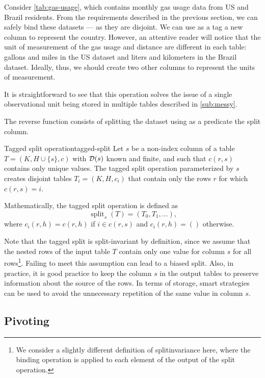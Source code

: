 Consider \cref{tab:gas-usage}, which contains monthly gas usage data from
US and Brazil residents.  From the requirements described in the previous section, we can
safely bind these datasets --- as they are disjoint.  We can use as a tag a new column to
represent the country.  However, an attentive reader will notice that the unit of
measurement of the gas usage and distance are different in each table: gallons and miles
in the US dataset and liters and kilometers in the Brazil dataset.  Ideally, thus, we
should create two other columns to represent the units of measurement.

It is straightforward to see that this operation solves the issue of a single
observational unit being stored in multiple tables described in \cref{sub:messy}.

The reverse function consists of splitting the dataset using as a predicate the split column.

\begin{defbox}{Tagged split operation}{tagged-split}
  Let $s$ be a non-index column of a table $T = (K, H \cup \{s\}, c)$ with $\mathcal{D}\!\left(s\right)$
  known and finite, and such that $c(r, s)$ contains only unique values. The tagged split
  operation parameterized by $s$ creates disjoint tables $T_i = (K, H, c_i)$ that contain
  only the rows $r$ for which $c(r, s) = i$.

  Mathematically, the tagged split operation is defined as \[
    \operatorname{split}_{s}(T) = \left(T_0, T_1, \dots\right)\text{,}
  \] where $c_i(r, h) = c(r, h)$ if $i \in c(r, s)$ and $c_i(r, h) = ()$ otherwise.
\end{defbox}

Note that the tagged split is split-invariant by definition, since we assume that the
nested rows of the input table $T$ contain only one value for column $s$ for all
rows\footnote{We consider a slightly different definition of \gls{splitinvariance} here, where
the binding operation is applied to each element of the output of the split operation.}.
Failing to meet this assumption can lead to a biased split.  Also, in practice, it is
good practice to keep the column $s$ in the output tables to preserve information about
the source of the rows.  In terms of storage, smart strategies can be used to avoid the
unnecessary repetition of the same value in column $s$.

\subsection{Pivoting}

